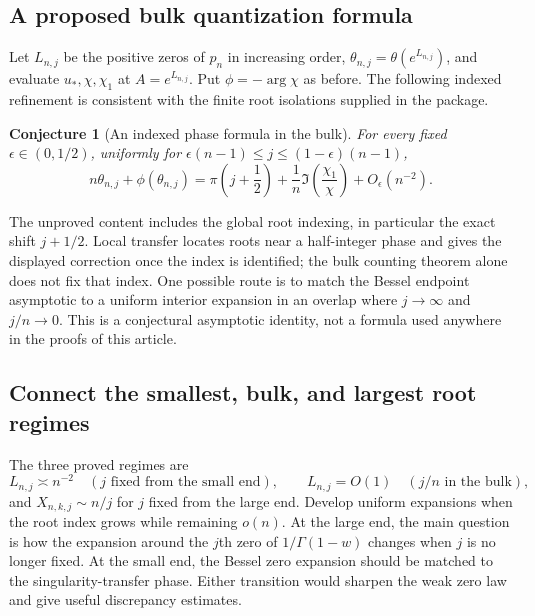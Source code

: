 \documentclass[11pt]{article}
\numberwithin{equation}{section}
\newtheorem{conjecture}[theorem]{Conjecture}
\theoremstyle{definition}
\theoremstyle{remark}
\begin{document}
\subsection{A proposed bulk quantization formula}

Let $L_{n,j}$ be the positive zeros of $p_n$ in increasing order,
$\theta_{n,j}=\theta(e^{L_{n,j}})$, and evaluate $u_*,\chi,\chi_1$
at $A=e^{L_{n,j}}$. Put $\phi=-\arg\chi$ as before.
The following indexed refinement is consistent with the finite root
isolations supplied in the package.

\begin{conjecture}[An indexed phase formula in the bulk]
\label{conj:bulk-quantization}
For every fixed $\epsilon\in(0,1/2)$, uniformly for
$\epsilon(n-1)\leq j\leq(1-\epsilon)(n-1)$,
\begin{equation}\label{eq:bulk-quantization-conjecture}
 n\theta_{n,j}+\phi(\theta_{n,j})
 =\pi\left(j+\frac12\right)
   +\frac1n\Im\left(\frac{\chi_1}{\chi}\right)
   +O_\epsilon(n^{-2}).
\end{equation}
\end{conjecture}

The unproved content includes the global root indexing, in particular
the exact shift $j+1/2$. Local transfer locates roots near a half-integer
phase and gives the displayed correction once the index is identified;
the bulk counting theorem alone does not fix that index. One possible
route is to match the Bessel endpoint asymptotic to a uniform interior
expansion in an overlap where $j\to\infty$ and $j/n\to0$.
This is a conjectural asymptotic identity, not a formula used anywhere
in the proofs of this article.

\subsection{Connect the smallest, bulk, and largest root regimes}

The three proved regimes are
\[
 L_{n,j}\asymp n^{-2}\quad(j\text{ fixed from the small end}),
 \qquad L_{n,j}=O(1)\quad(j/n\text{ in the bulk}),
\]
and $X_{n,k,j}\sim n/j$ for $j$ fixed from the large end.
Develop uniform expansions when the root index grows while remaining
$o(n)$. At the large end, the main question is how the expansion around
the $j$th zero of $1/\Gamma(1-w)$ changes when $j$ is no longer fixed.
At the small end, the Bessel zero expansion should be matched to the
singularity-transfer phase. Either transition would sharpen the weak
zero law and give useful discrepancy estimates.
\end{document}
